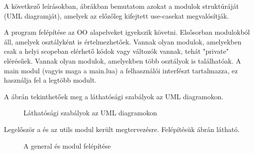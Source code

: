 \pagebreak

A következő leírásokban, ábrákban bemutatom azokat a modulok struktúráját (UML diagramját), amelyek az előzőleg kifejtett use-casekat megvalósítják.

A program felépítése az OO alapelveket igyekszik követni. Elsősorban modulokból áll, amelyek osztályként is értelmezhetőek. Vannak olyan modulok, amelyekben csak a helyi scopeban elérhető kódok vagy változók vannak, tehát "private" elérésűek. Vannak olyan modulok, amelyekben több osztályok is találhatóak. A main modul (vagyis maga a main.lua) a felhasználói interfészt tartalmazza, ez használja fel a legtöbb modult.

A  ábrán tekinthetőek meg a láthatósági szabályok az UML diagramokon.
\begin{figure}[h!]
	\centering
	\caption{Láthatósági szabályok az UML diagramokon}
	\label{fig:visibilityrules}
\end{figure}


Legelőször a  és az utils modul került megtervezésre. Felépítésük  ábrán látható.

\begin{figure}[h!]
	\centering
	\caption{A general és  modul felépítése}
	\label{fig:generalandaptpackages}
\end{figure}

